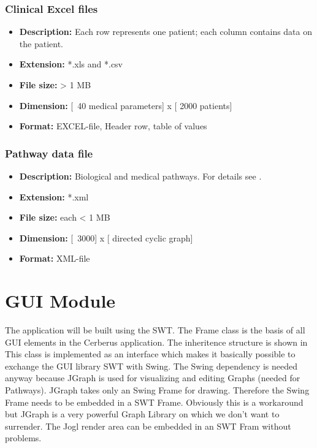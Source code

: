\subsubsection{Clinical Excel files}

\begin{itemize}
\item \textbf{Description: } Each row represents one patient; each column contains data on the patient.
\item \textbf{Extension: } *.xls  and  *.csv
\item \textbf{File size: } > 1 MB
\item \textbf{Dimension: } [~40 medical parameters] x [ 2000 patients]
\item \textbf{Format: } EXCEL-file, Header row, table of values
\end{itemize}

\subsubsection{Pathway data file}
\label{sssec:pathway_data_file}

\begin{itemize}
\item \textbf{Description: } Biological and medical pathways. For details see .
\item \textbf{Extension: } *.xml
\item \textbf{File size: } each < 1 MB
\item \textbf{Dimension: } [~3000] x [ directed cyclic graph]
\item \textbf{Format: } XML-file
\end{itemize}

\section{GUI Module}

The application will be built using the SWT. 
The Frame class is the basis of all GUI elements in the Cerberus application.
The inheritence structure is shown in  
This class is implemented as an interface which makes it basically possible to exchange the GUI library SWT with Swing.
The Swing dependency is needed anyway because JGraph is used for visualizing and editing Graphs (needed for Pathways).
JGraph takes only an Swing Frame for drawing. Therefore the Swing Frame needs to be embedded in a SWT Frame.
Obviously this is a workaround but JGraph is a very powerful Graph Library on which we don't want to surrender.
The Jogl render area can be embedded in an SWT Fram without problems.

